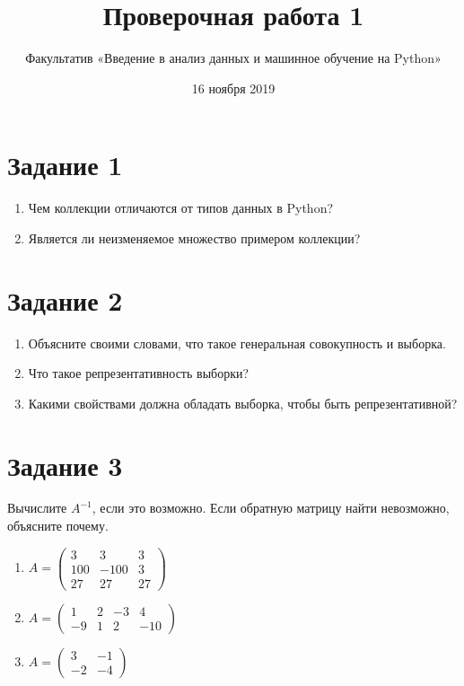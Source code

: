 \documentclass[11pt, a4paper]{extarticle}
\title{Проверочная работа 1}
\author{Факультатив «Введение в анализ данных и машинное обучение на Python»}
\date{16 ноября 2019}
\begin{document}
	
	\maketitle
	
	\section*{Задание 1} 
	\begin{enumerate}[label=\alph*)]
	\item Чем коллекции отличаются от типов данных в Python? 
	\item Является ли неизменяемое множество примером коллекции?
	\end{enumerate}

	\section*{Задание 2}
	\begin{enumerate}[label=\alph*)]
		\item Объясните своими словами, что такое генеральная совокупность и выборка.
		\item Что такое репрезентативность выборки?
		\item Какими свойствами должна обладать выборка, чтобы быть репрезентативной?
	\end{enumerate}
	
	\section*{Задание 3}
	Вычислите $A^{-1}$, если это возможно. Если обратную матрицу найти невозможно, объясните почему.
	\begin{multicols}{3}
	\begin{enumerate}[label=\alph*)]
		\item $A = \begin{pmatrix}
		3 & 3 & 3 \\
		100 & -100 & 3 \\
		27 & 27 & 27
		\end{pmatrix}$
		
		\item $A = \begin{pmatrix}
		1 & 2 & -3 & 4 \\
		-9 & 1 & 2 & -10
		\end{pmatrix}$
		
		\item $A = \begin{pmatrix}
		3 & -1 \\
		-2 & -4
		\end{pmatrix}$
	\end{enumerate} 
	\end{multicols}
	
\end{document}
